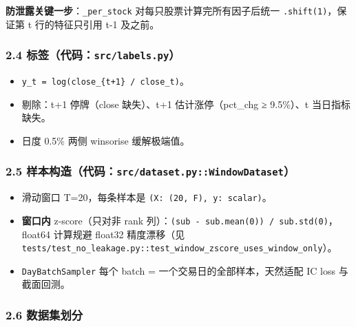 \documentclass[
  fontset=fandol]{ctexart}
\providecommand{\tightlist}{%
  \setlength{\itemsep}{0pt}\setlength{\parskip}{0pt}}
\begin{document}
\textbf{防泄露关键一步}：\texttt{\_per\_stock}
对每只股票计算完所有因子后统一
\texttt{.shift(1)}，保证第 t
行的特征只引用 t-1 及之前。

\hypertarget{ux6807ux7b7eux4ee3ux7801srclabels.py}{%
\subsubsection{\texorpdfstring{2.4
标签（代码：\texttt{src/labels.py}）}{2.4 标签（代码：src/labels.py）}}\label{ux6807ux7b7eux4ee3ux7801srclabels.py}}

\begin{itemize}
\tightlist
\item
  \texttt{y\_t\ =\ log(close\_\{t+1\}\ /\ close\_t)}。
\item
  剔除：t+1 停牌（close 缺失）、t+1
  估计涨停（\textbar pct\_chg\textbar{}
  ≥ 9.5\%）、t 当日指标缺失。
\item
  日度 0.5\% 两侧 winsorise 缓解极端值。
\end{itemize}

\hypertarget{ux6837ux672cux6784ux9020ux4ee3ux7801srcdataset.pywindowdataset}{%
\subsubsection{\texorpdfstring{2.5
样本构造（代码：\texttt{src/dataset.py::WindowDataset}）}{2.5 样本构造（代码：src/dataset.py::WindowDataset）}}\label{ux6837ux672cux6784ux9020ux4ee3ux7801srcdataset.pywindowdataset}}

\begin{itemize}
\tightlist
\item
  滑动窗口 T=20，每条样本是
  \texttt{(X:\ (20,\ F),\ y:\ scalar)}。
\item
  \textbf{窗口内} z-score（只对非 rank
  列）：\texttt{(sub\ -\ sub.mean(0))\ /\ sub.std(0)}，float64
  计算规避 float32 精度漂移（见
  \texttt{tests/test\_no\_leakage.py::test\_window\_zscore\_uses\_window\_only}）。
\item
  \texttt{DayBatchSampler} 每个 batch =
  一个交易日的全部样本，天然适配 IC loss
  与截面回测。
\end{itemize}

\hypertarget{ux6570ux636eux96c6ux5212ux5206}{%
\subsubsection{2.6
数据集划分}\label{ux6570ux636eux96c6ux5212ux5206}}
\end{document}
